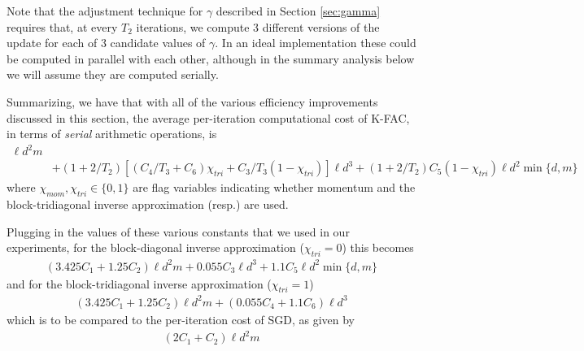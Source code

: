 \documentclass[12pt]{article}
\newcommand{\acronym}{K-FAC}
\begin{document}
Note that the adjustment technique for $\gamma$ described in Section \ref{sec:gamma} requires that, at every $T_2$ iterations, we compute 3 different versions of the update for each of 3 candidate values of $\gamma$.  In an ideal implementation these could be computed in parallel with each other, although in the summary analysis below we will assume they are computed serially.

Summarizing, we have that with all of the various efficiency improvements discussed in this section, the average per-iteration computational cost of \acronym{}, in terms of \emph{serial} arithmetic operations, is
\begin{align*}
[ (2 &+ \tau_1 + 2(1+\chi_{mom})(1+2/T_2)\tau_2 + 1/T_1)C_1 + (1 + 2 \tau_1) C_2 ] \ell d^2 m \\
&+ (1+2/T_2) [(C_4/T_3 + C_6)\chi_{tri} + C_3/T_3 (1-\chi_{tri})] \ell d^3 + (1+2/T_2) C_5  (1-\chi_{tri}) \ell d^2\min\{d,m\}
\end{align*}
where $\chi_{mom}, \chi_{tri} \in \{0,1\}$ are flag variables indicating whether momentum and the block-tridiagonal inverse approximation (resp.) are used.  

Plugging in the values of these various constants that we used in our experiments, for the block-diagonal inverse approximation ($\chi_{tri} = 0$) this becomes
\begin{align*}
( 3.425 C_1 + 1.25 C_2 ) \ell d^2 m +  0.055 C_3 \ell d^3 + 1.1 C_5 \ell d^2\min\{d,m\}
\end{align*}
and for the block-tridiagonal inverse approximation ($\chi_{tri} = 1$)
\begin{align*}
( 3.425 C_1 + 1.25 C_2 ) \ell d^2 m + (0.055 C_4 + 1.1 C_6) \ell d^3
\end{align*}
which is to be compared to the per-iteration cost of SGD, as given by
\begin{align*}
(2C_1 + C_2) \ell d^2 m
\end{align*}
\end{document}
